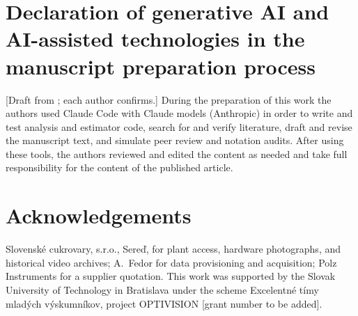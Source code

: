 \section*{Declaration of generative AI and AI-assisted technologies in the manuscript preparation process}
[Draft from ; each author confirms.] During the preparation of this work the authors used
Claude Code with Claude models (Anthropic) in order to write and test analysis and estimator code, search for and
verify literature, draft and revise the manuscript text, and simulate peer review and notation audits. After using these
tools, the authors reviewed and edited the content as needed and take full responsibility for the content of the
published article.

\section*{Acknowledgements}
Slovensk\'e cukrovary, s.r.o., Sere\v{d}, for plant access, hardware photographs, and historical video archives;
A.~Fedor for data provisioning and acquisition; Polz Instruments for a supplier quotation. This work was
supported by the Slovak University of Technology in Bratislava under the scheme Excelentn\'e t\'imy mlad\'ych
v\'yskumn\'ikov, project OPTIVISION [grant number to be added].
